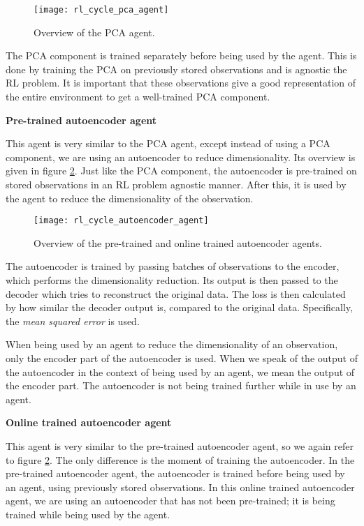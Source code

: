 \begin{figure}[h]
    \centering
    \texttt{[image: rl\_cycle\_pca\_agent]}
    \caption{Overview of the PCA agent.}
    \label{fig:rl_cycle_pca}
\end{figure}

The PCA component is trained separately before being used by the agent. This is done by training the PCA on previously stored observations and is agnostic the RL problem. It is important that these observations give a good representation of the entire environment to get a well-trained PCA component. \newline \par

\noindent \textbf{Pre-trained autoencoder agent} \par
\noindent This agent is very similar to the PCA agent, except instead of using a PCA component, we are using an autoencoder to reduce dimensionality. Its overview is given in figure \ref{fig:rl_cycle_ae}. Just like the PCA component, the autoencoder is pre-trained on stored observations in an RL problem agnostic manner. After this, it is used by the agent to reduce the dimensionality of the observation. 

\begin{figure}[h]
    \centering
    \texttt{[image: rl\_cycle\_autoencoder\_agent]}
    \caption{Overview of the pre-trained and online trained autoencoder agents.}
    \label{fig:rl_cycle_ae}
\end{figure}

The autoencoder is trained by passing batches of observations to the encoder, which performs the dimensionality reduction. Its output is then passed to the decoder which tries to reconstruct the original data. The loss is then calculated by how similar the decoder output is, compared to the original data. Specifically, the \emph{mean squared error} is used.

When being used by an agent to reduce the dimensionality of an observation, only the encoder part of the autoencoder is used. When we speak of the output of the autoencoder in the context of being used by an agent, we mean the output of the encoder part. The autoencoder is not being trained further while in use by an agent.\newline \par

\noindent \textbf{Online trained autoencoder agent} \par
\noindent  This agent is very similar to the pre-trained autoencoder agent, so we again refer to figure \ref{fig:rl_cycle_ae}. The only difference is the moment of training the autoencoder. In the pre-trained autoencoder agent, the autoencoder is trained before being used by an agent, using previously stored observations. In this online trained autoencoder agent, we are using an autoencoder that has not been pre-trained; it is being trained while being used by the agent. 

